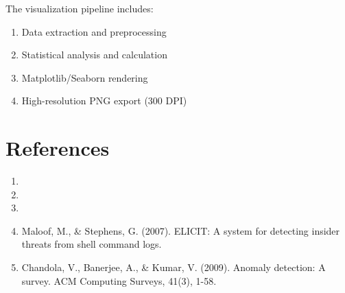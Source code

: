 \documentclass[12pt,a4paper]{report}
\begin{document}
The visualization pipeline includes:
\begin{enumerate}
    \item Data extraction and preprocessing
    \item Statistical analysis and calculation
    \item Matplotlib/Seaborn rendering
    \item High-resolution PNG export (300 DPI)
\end{enumerate}

\chapter{References}

\begin{enumerate}
    \item [INSERT REFERENCE 1]
    \item [INSERT REFERENCE 2]
    \item [INSERT REFERENCE 3]
    \item Maloof, M., \& Stephens, G. (2007). ELICIT: A system for detecting insider threats from shell command logs.
    \item Chandola, V., Banerjee, A., \& Kumar, V. (2009). Anomaly detection: A survey. ACM Computing Surveys, 41(3), 1-58.
\end{enumerate}
\end{document}
